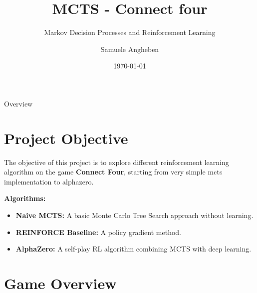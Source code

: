 \documentclass[aspectratio=169,xcolor=dvipsnames]{beamer}
\title{MCTS - Connect four}
\subtitle{Markov Decision Processes and Reinforcement Learning}
\author{Samuele Angheben}
\institute
{
    Trento University %
}
\date{\today} %
\begin{document}
\begin{frame}
    \titlepage
\end{frame}

\begin{frame}{Overview}
    \tableofcontents
\end{frame}

\section{Project Objective}

\begin{frame}{}
The objective of this project is to explore different reinforcement learning algorithm on the game \textbf{Connect Four}, starting from very simple mcts implementation to alphazero. 

\medskip
\medskip
\medskip
\textbf{Algorithms:}
\begin{itemize}
    \item \textbf{Naive MCTS:} A basic Monte Carlo Tree Search approach without learning.
    \item \textbf{REINFORCE Baseline:} A policy gradient method.
    \item \textbf{AlphaZero:} A self-play RL algorithm combining MCTS with deep learning.
\end{itemize}
\end{frame}


\section{Game Overview}
\end{document}
